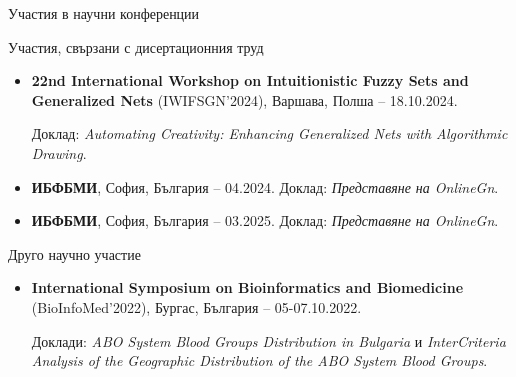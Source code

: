 \documentclass[aspectratio=169]{beamer}
\begin{document}
\begin{frame}{Участия в научни конференции}
\scriptsize

\begin{block}{Участия, свързани с дисертационния труд}
\begin{itemize}
    \setlength{\itemsep}{0.7em}

    \item \textbf{22nd International Workshop on Intuitionistic Fuzzy Sets and Generalized Nets}
    (IWIFSGN'2024), Варшава, Полша -- 18.10.2024.

    Доклад: \textit{Automating Creativity: Enhancing Generalized Nets with Algorithmic Drawing}.

    \item \textbf{ИБФБМИ}, София, България -- 04.2024. Доклад: \textit{Представяне на OnlineGn}.

    \item \textbf{ИБФБМИ}, София, България -- 03.2025. Доклад: \textit{Представяне на OnlineGn}.
\end{itemize}
\end{block}

\vspace{0.3em}

\begin{block}{Друго научно участие}
\begin{itemize}
    \setlength{\itemsep}{0.5em}

    \item \textbf{International Symposium on Bioinformatics and Biomedicine}
    (BioInfoMed'2022), Бургас, България -- 05-07.10.2022.

    Доклади: \textit{ABO System Blood Groups Distribution in Bulgaria} и
    \textit{InterCriteria Analysis of the Geographic Distribution of the ABO System Blood Groups}.
\end{itemize}
\end{block}

\end{frame}
\end{document}
